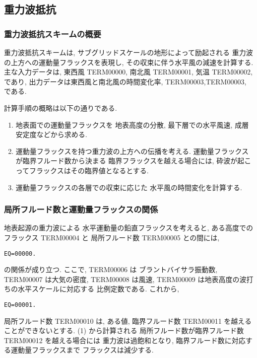 ﻿
\subsection{重力波抵抗}

\subsubsection{重力波抵抗スキームの概要}

重力波抵抗スキームは,
サブグリッドスケールの地形によって励起される
重力波の上方への運動量フラックスを表現し,
その収束に伴う水平風の減速を計算する.
主な入力データは, 東西風 TERM00000, 南北風 TERM00001, 気温 TERM00002, であり,
出力データは東西風と南北風の時間変化率,
TERM00003,TERM00003, である.

計算手順の概略は以下の通りである.
%
\begin{enumerate}
\item 地表面での運動量フラックスを
      地表高度の分散, 
      最下層での水平風速, 成層安定度などから求める.
\item 運動量フラックスを持つ重力波の上方への伝播を考える.
      運動量フラックスが臨界フルード数から決まる
      臨界フラックスを越える場合には,
      砕波が起こってフラックスはその臨界値となるとする.
\item 運動量フラックスの各層での収束に応じた
      水平風の時間変化を計算する.
\end{enumerate}

\subsubsection{局所フルード数と運動量フラックスの関係}

地表起源の重力波による
水平運動量の鉛直フラックスを考えると,
ある高度でのフラックス TERM00004 と
局所フルード数 TERM00005 との間には,
\begin{verbatim}
EQ=00000.
\end{verbatim}
の関係が成り立つ.
ここで, TERM00006 は
ブラントバイサラ振動数, 
TERM00007 は大気の密度, 
TERM00008 は風速, TERM00009 は地表高度の波打ちの水平スケールに対応する
比例定数である.
これから,
\begin{verbatim}
EQ=00001.
\end{verbatim}

局所フルード数 TERM00010 は,
ある値, 臨界フルード数 TERM00011 を越えることができないとする.
(1) から計算される
局所フルード数が臨界フルード数 TERM00012 を越える場合には
重力波は過飽和となり,
臨界フルード数に対応する運動量フラックスまで
フラックスは減少する.

